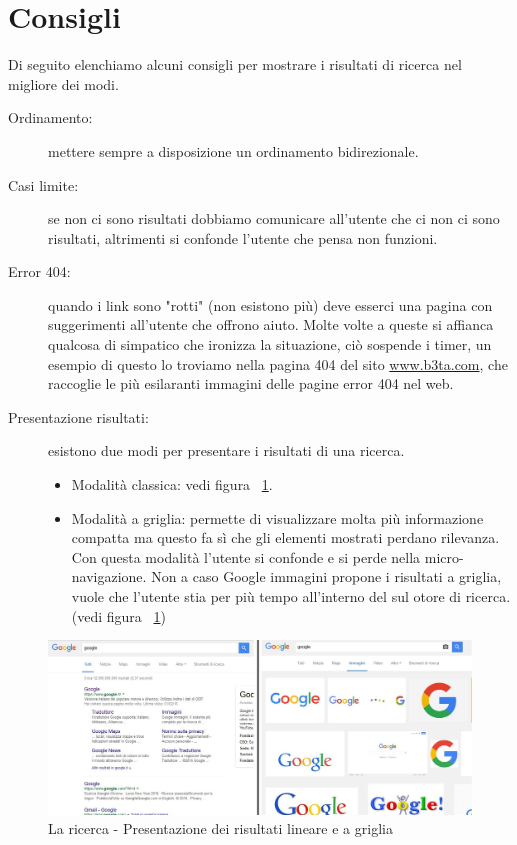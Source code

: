	\section{Consigli}
		Di seguito elenchiamo alcuni consigli per mostrare i risultati di ricerca nel migliore dei modi.
		\begin{description}
			\item[Ordinamento:] mettere sempre a disposizione un ordinamento bidirezionale.
			\item[Casi limite:] se non ci sono risultati dobbiamo comunicare all'utente che ci non ci sono risultati, altrimenti si confonde l'utente che pensa non funzioni.
			\item[Error 404:] \label{sec:error404} quando i link sono "rotti" (non esistono più) deve esserci una pagina con suggerimenti all'utente che offrono aiuto. Molte volte a queste si affianca qualcosa di simpatico che ironizza la situazione, ciò sospende i timer, un esempio di questo lo troviamo nella pagina 404 del sito \href{http://www.b3ta.com/error404}{www.b3ta.com}, che raccoglie le più esilaranti immagini delle pagine error 404 nel web.
			\item[Presentazione risultati:] esistono due modi per presentare i risultati di una ricerca.
				\begin{itemize}
					\item Modalità classica: vedi figura ~\ref{fig:LaRicerca-Consigli}.
					\item Modalità a griglia: permette di visualizzare molta più informazione compatta ma questo fa sì che gli elementi mostrati perdano rilevanza. Con questa modalità l'utente si confonde e si perde nella micro-navigazione. Non a caso Google immagini propone i risultati a griglia, vuole che l'utente stia per più tempo all'interno del sul otore di ricerca. (vedi figura ~\ref{fig:LaRicerca-Consigli})
				\end{itemize}
		\end{description}
		
		\begin{figure}
			\centering
			\includegraphics[width=\textwidth]{images/LaRicerca-Consigli}
			\caption[La ricerca - Tipi di presentazioni risultati]{La ricerca - Presentazione dei risultati lineare e a griglia}
			\label{fig:LaRicerca-Consigli}
		\end{figure}
		

